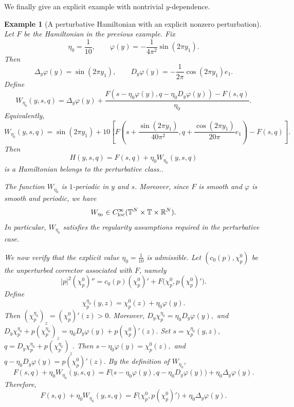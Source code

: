 \documentclass[preprint]{elsarticle}
\newtheorem{example}{Example}[section]
\numberwithin{equation}{section}
\begin{document}
We finally give an explicit example with nontrivial $y$-dependence.
\begin{example}[A perturbative Hamiltonian with an explicit nonzero perturbation]
Let $F$ be the Hamiltonian in the previous example. Fix
\begin{equation*}
\eta_0=\frac{1}{10},
\qquad
\varphi(y)=-\frac{1}{4\pi^2}\sin(2\pi y_1).
\end{equation*}
Then
\begin{equation*}
\Delta_y\varphi(y)=\sin(2\pi y_1),
\qquad
D_y\varphi(y)
=
-\frac{1}{2\pi}\cos(2\pi y_1)e_1.
\end{equation*}
Define
\begin{equation*}
W_{\eta_0}(y,s,q)
=
\Delta_y\varphi(y)
+
\frac{
F(s-\eta_0\varphi(y),q-\eta_0D_y\varphi(y))-F(s,q)
}{\eta_0}.
\end{equation*}
Equivalently,
\begin{equation*}
W_{\eta_0}(y,s,q)
=
\sin(2\pi y_1)
+
10\left[
F\left(
s+\frac{\sin(2\pi y_1)}{40\pi^2},
q+\frac{\cos(2\pi y_1)}{20\pi}e_1
\right)
-
F(s,q)
\right].
\end{equation*}
Then
\begin{equation*}
H(y,s,q)=F(s,q)+\eta_0 W_{\eta_0}(y,s,q)
\end{equation*}
is a Hamiltonian belongs to the perturbative class..

The function $W_{\eta_0}$ is $1$-periodic in $y$ and $s$. Moreover, since $F$ is smooth and $\varphi$ is smooth and periodic, we have
\begin{equation*}
W_{\eta_0}\in C^\infty_{\rm loc}(\mathbb T^N\times\mathbb T\times\mathbb R^N).
\end{equation*}
In particular, $W_{\eta_0}$ satisfies the regularity assumptions required in the perturbative case.

We now verify that the explicit value
$
\eta_0=\frac{1}{10}
$
is admissible. Let $(c_0(p),\chi_p^0)$ be the unperturbed corrector associated with $F$, namely
\begin{equation*}
|p|^2(\chi_p^0)''
=
c_0(p)(\chi_p^0)'
+
F\bigl(\chi_p^0,p(\chi_p^0)'\bigr).
\end{equation*}
Define
\begin{equation*}
\chi_p^{\eta_0}(y,z)
=
\chi_p^0(z)+\eta_0\varphi(y).
\end{equation*}
Then $(\chi_p^{\eta_0})_z=(\chi_p^0)'(z)>0.$
Moreover, $D_y\chi_p^{\eta_0}
=
\eta_0D_y\varphi(y),$
and $D_y\chi_p^{\eta_0}
+
p(\chi_p^{\eta_0})_z
=
\eta_0D_y\varphi(y)+p(\chi_p^0)'(z).$
Set $s=\chi_p^{\eta_0}(y,z),
$ $
q=D_y\chi_p^{\eta_0}
+
p(\chi_p^{\eta_0})_z.$
Then $s-\eta_0\varphi(y)=\chi_p^0(z),$
and $q-\eta_0D_y\varphi(y)=p(\chi_p^0)'(z).$
By the definition of $W_{\eta_0}$,
\begin{equation*}
F(s,q)+\eta_0W_{\eta_0}(y,s,q)
=
F\bigl(s-\eta_0\varphi(y),q-\eta_0D_y\varphi(y)\bigr)
+
\eta_0\Delta_y\varphi(y).
\end{equation*}
Therefore,
\begin{equation*}
F(s,q)+\eta_0W_{\eta_0}(y,s,q)
=
F\bigl(\chi_p^0,p(\chi_p^0)'\bigr)
+
\eta_0\Delta_y\varphi(y).
\end{equation*}


\end{example}
\end{document}
